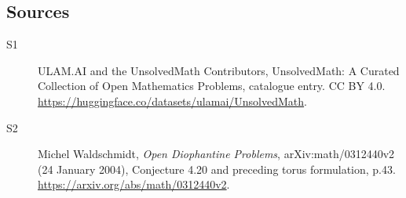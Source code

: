 \documentclass[11pt]{article}
\begin{document}
\subsection{Sources}
\begin{description}
\item[\hypertarget{source:statement:1}{S1}] ULAM.AI and the UnsolvedMath Contributors, UnsolvedMath: A Curated Collection of Open Mathematics Problems, catalogue entry. CC BY 4.0. \url{https://huggingface.co/datasets/ulamai/UnsolvedMath}.
\item[\hypertarget{source:statement:2}{S2}] Michel Waldschmidt, \emph{Open Diophantine Problems}, arXiv:math/0312440v2 (24 January 2004), Conjecture 4.20 and preceding torus formulation, p.43. \url{https://arxiv.org/abs/math/0312440v2}.
\end{description}
\label{end:statement}
\end{document}
